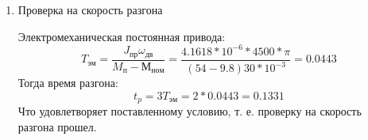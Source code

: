 \documentclass{article}
\begin{document}
\begin{enumerate}
\begin{enumerate}
		\item Проверка на скорость разгона

		Электромеханическая постоянная привода:
		$$
		T_{эм} = \frac{ J_{пр} \omega_{дв}}{M_п - М_{ном}} = \frac{4.1618 * 10^{-6} * 4500 * \pi}{\left(54 - 9.8\right) 30 * 10^{-3}} = 0.0443
		$$
		Тогда время разгона:
		$$
		t_p = 3 T_{эм} = 2 * 0.0443 = 0.1331
		$$
		Что удовлетворяет поставленному условию, т. е. проверку на скорость разгона прошел.
	\end{enumerate}
\end{enumerate}
	
\end{document}
